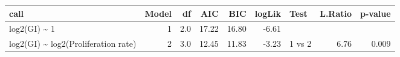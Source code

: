 \begin{table}[ht]
\centering
\begin{tabular}{lrrrrrlrr}
  \hline
call & Model & df & AIC & BIC & logLik & Test & L.Ratio & p-value \\ 
  \hline
log2(GI) \~{} 1 &  1 & 2.0 & 17.22 & 16.80 & -6.61 &  &  &  \\ 
  log2(GI) \~{} log2(Proliferation rate) &  2 & 3.0 & 12.45 & 11.83 & -3.23 & 1 vs 2 & 6.76 & 0.009 \\ 
   \hline
\end{tabular}
\end{table}
